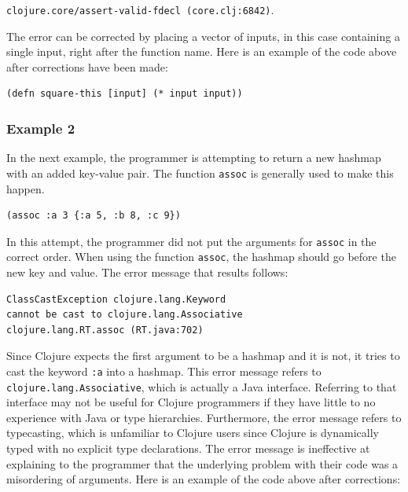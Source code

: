 \documentclass[12pt]{article}
\newcommand{\comment}[1]{{\bf \tt  {#1}}}
\newcommand{\emcomment}[1]{\textcolor{ForestGreen}{\comment{Elena: {#1}}}}
\begin{document}
\noindent
\texttt{clojure.core/assert-valid-fdecl (core.clj:6842)}.



The error can be corrected by placing a vector of inputs, in this case containing a single input, right 
after the function name.
Here is an example of the code above after corrections have been made:
\begin{verbatim}
(defn square-this [input] (* input input))
\end{verbatim}

\subsubsection{Example 2}\label{sec:ex2}

In the next example, the programmer is attempting to return a new hashmap with an added key-value pair.
The function \texttt{assoc} is generally used to make this happen.
\begin{verbatim}
(assoc :a 3 {:a 5, :b 8, :c 9})
\end{verbatim}

In this attempt, the programmer did not put the arguments for \texttt{assoc} in the correct order.
When using the function \texttt{assoc}, the hashmap should go before the new key and value.
The error message that results follows:

\begin{verbatim}
ClassCastException clojure.lang.Keyword 
cannot be cast to clojure.lang.Associative
clojure.lang.RT.assoc (RT.java:702)
\end{verbatim}

Since Clojure expects the first argument to be a hashmap and it is not, it tries to cast 
the keyword \texttt{:a} into a hashmap.
This error message refers to \texttt{clojure.lang.Associative}, which is actually a Java interface.
Referring to that interface may not be useful for Clojure programmers if they have little to no 
experience with Java or type hierarchies.
Furthermore, the error message refers to typecasting, which is unfamiliar to Clojure users since 
Clojure is dynamically typed with no explicit type declarations.
The error message is ineffective at explaining to the programmer that the underlying problem with their 
code was a misordering of arguments.
Here is an example of the code above after corrections:
 
\end{document}
